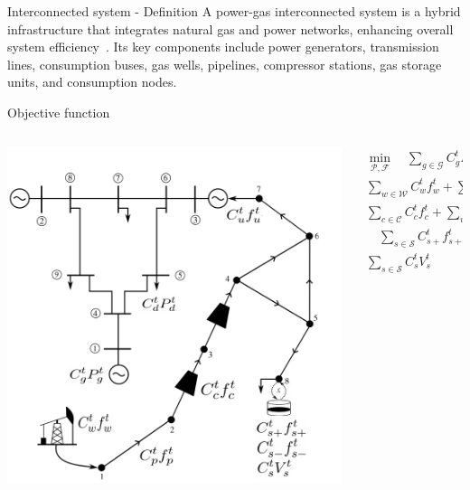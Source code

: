 \documentclass[hyperref={colorlinks,citecolor=blue,linkcolor=blue,urlcolor=blue}]{beamer}
\begin{document}
\begin{frame}{Interconnected system - Definition}
A power-gas interconnected system is a hybrid infrastructure that integrates natural gas and power networks, enhancing overall system efficiency~\cite{Duan_Liu_Yang_2022}. Its key components include power generators, transmission lines, consumption buses, gas wells, pipelines, compressor stations, gas storage units, and consumption nodes. 
\end{frame}


\begin{frame}{Objective function}
\begin{columns}
\begin{column}{0.5\textwidth}
   \begin{center}
     \includegraphics[width=1.1\textwidth]{figures/network_math_alternative.pdf}
     \end{center}
\end{column}
\begin{column}{0.5\textwidth}  %
\begin{equation} \label{eq:obj_func_integrated}
\begin{split}
\min_{\mathcal{P}, \mathcal{F}} \quad  \sum_{g \in \mathcal{G}} C_{g}^t {P_{g}^t} + \sum_{d \in \mathcal{D}} C_{d}^t {P_{d}^t} +  \\ \sum_{w \in \mathcal{W}} C_{w}^t {f_{w}^t} +  \sum_{p \in \mathcal{P}} C_{p}^t {f_{p}^t}  + \\ \sum_{c \in \mathcal{C}} C_{c}^t {f_{c}^t} + \sum_{u \in \mathcal{U}} C_{u}^{t} {f_{u}^{t}} + \\ \quad \sum_{s \in \mathcal{S}} C_{s+}^{t} {f_{s+}^{t}}  + \sum_{s \in \mathcal{S}} C_{s-}^{t} {f_{s-}^{t}} + \\ \sum_{s \in \mathcal{S}} C_{s}^{t} {V_{s}^{t}}
\end{split}
\end{equation} 
\end{column}
\end{columns}
\end{frame}
\end{document}
